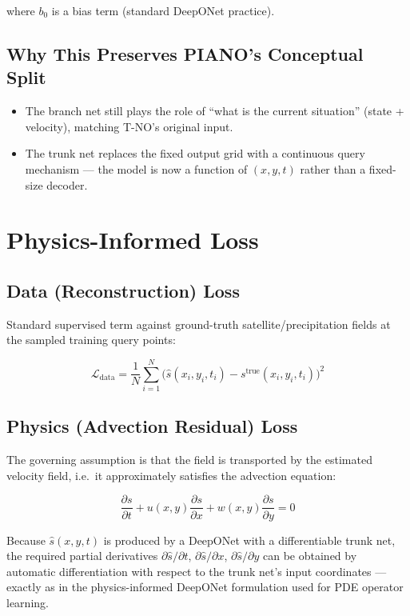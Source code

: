 \documentclass[11pt]{article}
\begin{document}
where $b_0$ is a bias term (standard DeepONet practice).

\subsection{Why This Preserves PIANO's Conceptual Split}

\begin{itemize}
    \item The branch net still plays the role of ``what is the current situation'' (state + velocity), matching T-NO's original input.
    \item The trunk net replaces the fixed output grid with a continuous query mechanism --- the model is now a function of $(x,y,t)$ rather than a fixed-size decoder.
\end{itemize}

\section{Physics-Informed Loss}

\subsection{Data (Reconstruction) Loss}

Standard supervised term against ground-truth satellite/precipitation fields at the sampled training query points:

\begin{equation}
\mathcal{L}_{\text{data}} = \frac{1}{N} \sum_{i=1}^{N} \big(\hat{s}(x_i, y_i, t_i) - s^{\text{true}}(x_i, y_i, t_i)\big)^2
\end{equation}

\subsection{Physics (Advection Residual) Loss}

The governing assumption is that the field is transported by the estimated velocity field, i.e.\ it approximately satisfies the advection equation:

\begin{equation}
\frac{\partial s}{\partial t} + u(x,y)\frac{\partial s}{\partial x} + w(x,y)\frac{\partial s}{\partial y} = 0
\end{equation}

Because $\hat{s}(x,y,t)$ is produced by a DeepONet with a differentiable trunk net, the required partial derivatives $\partial \hat{s}/\partial t$, $\partial \hat{s}/\partial x$, $\partial \hat{s}/\partial y$ can be obtained by automatic differentiation with respect to the trunk net's input coordinates --- exactly as in the physics-informed DeepONet formulation used for PDE operator learning.
\end{document}
